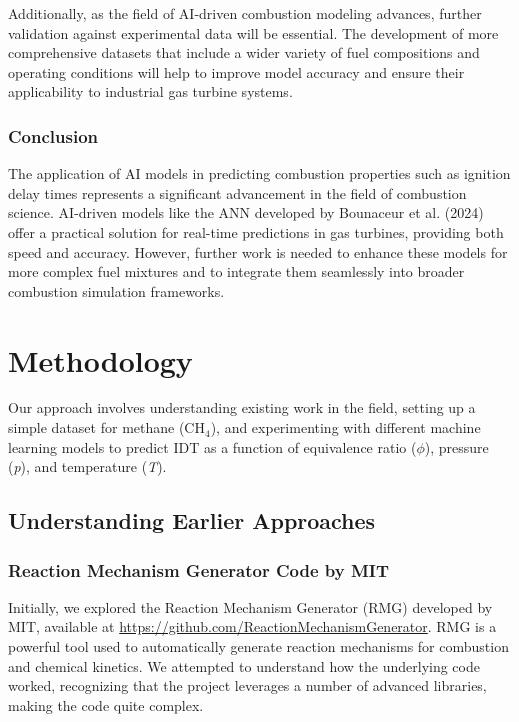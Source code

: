 \documentclass[12pt]{report}
\begin{document}
Additionally, as the field of AI-driven combustion modeling advances, further validation against experimental data will be essential. The development of more comprehensive datasets that include a wider variety of fuel compositions and operating conditions will help to improve model accuracy and ensure their applicability to industrial gas turbine systems.

\subsection{Conclusion}
The application of AI models in predicting combustion properties such as ignition delay times represents a significant advancement in the field of combustion science. AI-driven models like the ANN developed by Bounaceur et al. (2024) offer a practical solution for real-time predictions in gas turbines, providing both speed and accuracy. However, further work is needed to enhance these models for more complex fuel mixtures and to integrate them seamlessly into broader combustion simulation frameworks.





\chapter{Methodology}

Our approach involves understanding existing work in the field, setting up a simple dataset for methane (CH\(_4\)), and experimenting with different machine learning models to predict IDT as a function of equivalence ratio (\(\phi\)), pressure (\textit{p}), and temperature (\textit{T}).

\section{Understanding Earlier Approaches}
\subsection{Reaction Mechanism Generator Code by MIT}

Initially, we explored the Reaction Mechanism Generator (RMG) developed by MIT, available at \url{https://github.com/ReactionMechanismGenerator}.
\newline
RMG is a powerful tool used to automatically generate reaction mechanisms for combustion and chemical kinetics. We attempted to understand how the underlying code worked, recognizing that the project leverages a number of advanced libraries, making the code quite complex.
\end{document}
